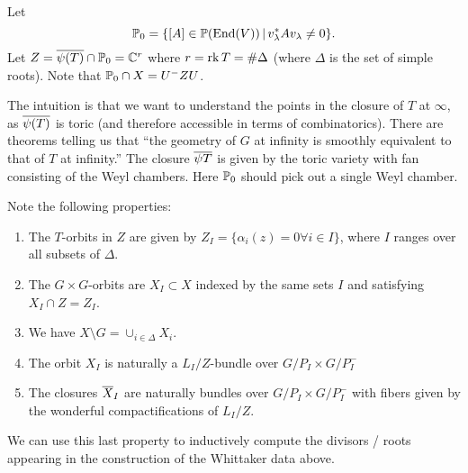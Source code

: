 \documentclass{article}
\begin{document}
Let 
\[
	\mathbb{P}_0 = \{ [A] \in \mathbb{P}(\operatorname{End}(V)) \, | \, v_\lambda^* A v_\lambda \neq 0 \}.
\]
Let $Z = \overline{\psi(T)} \cap \mathbb{P}_0 = \mathbb{C}^r$ where $r = \operatorname{rk} T = \# \Delta$ (where $\Delta$ is the set of simple roots).
Note that $\mathbb{P}_0 \cap X = U^- Z U$.

\begin{rmk}
	The intuition is that we want to understand the points in the closure of $T$ at $\infty$, as $\overline{\psi(T)}$ is toric (and therefore accessible in terms of combinatorics).
	There are theorems telling us that ``the geometry of $G$ at infinity is smoothly equivalent to that of $T$ at infinity.''
	The closure $\overline{\psi{T}}$ is given by the toric variety with fan consisting of the Weyl chambers.
	Here $\mathbb{P}_0$ should pick out a single Weyl chamber.
\end{rmk}

Note the following properties:
\begin{enumerate}
	\item The $T$-orbits in $Z$ are given by $Z_I = \{ \alpha_i(z) = 0 \forall i \in I\}$, where $I$ ranges over all subsets of $\Delta$.
	\item The $G \times G$-orbits are $X_I \subset X$ indexed by the same sets $I$ and satisfying $X_I \cap Z = Z_I$.
	\item We have $X \setminus G = \cup_{i \in \Delta} X_i$.
	\item The orbit $X_I$ is naturally a $L_I / Z$-bundle over $G/P_I \times G/P_I^-$
	\item The closures $\overline{X}_I$ are naturally bundles over $G/P_I \times G/P_I^-$ with fibers given by the wonderful compactifications of $L_I / Z$.
\end{enumerate}

We can use this last property to inductively compute the divisors / roots appearing in the construction of the Whittaker data above.
\end{document}
